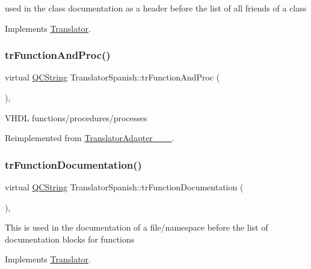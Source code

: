 used in the class documentation as a header before the list of all friends of a class 

Implements \mbox{\hyperlink{class_translator}{Translator}}.

\mbox{\label{class_translator_spanish_ae5d86a659a60b040ddc479168aa8ed8d}} 
\subsubsection{\texorpdfstring{trFunctionAndProc()}{trFunctionAndProc()}}
{\footnotesize\ttfamily virtual \mbox{\hyperlink{class_q_c_string}{Q\+C\+String}} Translator\+Spanish\+::tr\+Function\+And\+Proc (\begin{DoxyParamCaption}{ }\end{DoxyParamCaption})\hspace{0.3cm}{\ttfamily [inline]}, {\ttfamily [virtual]}}

V\+H\+DL functions/procedures/processes 

Reimplemented from \mbox{\hyperlink{class_translator_adapter__1__8__15}{Translator\+Adapter\+\_\+\_\+\_}}.

\mbox{\label{class_translator_spanish_a571503bb5c10f588f876990e055d9086}} 
\subsubsection{\texorpdfstring{trFunctionDocumentation()}{trFunctionDocumentation()}}
{\footnotesize\ttfamily virtual \mbox{\hyperlink{class_q_c_string}{Q\+C\+String}} Translator\+Spanish\+::tr\+Function\+Documentation (\begin{DoxyParamCaption}{ }\end{DoxyParamCaption})\hspace{0.3cm}{\ttfamily [inline]}, {\ttfamily [virtual]}}

This is used in the documentation of a file/namespace before the list of documentation blocks for functions 

Implements \mbox{\hyperlink{class_translator}{Translator}}.

